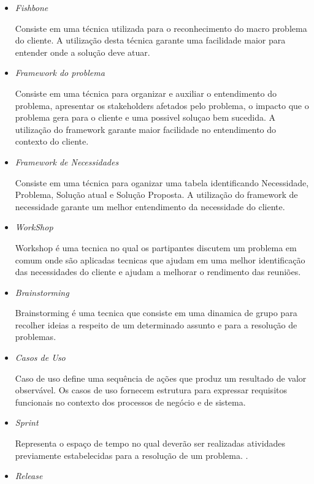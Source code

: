 \begin{itemize}
	\item \textit{Fishbone}

		Consiste em uma técnica utilizada para o reconhecimento do macro problema do cliente. A utilização desta técnica garante uma facilidade maior para entender onde a solução deve atuar.

	\item \textit{Framework do problema}

		Consiste em uma técnica para organizar e auxiliar o entendimento do problema, apresentar os stakeholders afetados pelo problema, o impacto que o problema gera para o cliente e uma possivel soluçao bem sucedida. A utilização do framework garante maior facilidade no entendimento do contexto do cliente.

	\item \textit{Framework de Necessidades}

		Consiste em uma técnica para oganizar uma tabela identificando Necessidade, Problema, Solução atual e Solução Proposta. A utilização do framework de necessidade garante um melhor entendimento da necessidade do cliente.
 
	\item \textit{WorkShop}

		 Workshop é uma tecnica no qual os partipantes discutem um problema em comum onde são aplicadas tecnicas que ajudam em uma melhor identificação das necessidades do cliente e ajudam a melhorar o rendimento das reuniões.

	\item \textit{Brainstorming}

		 Brainstorming é uma tecnica que consiste em uma dinamica de grupo para recolher ideias a respeito de um determinado assunto e para a resolução de problemas.

	\item \textit{Casos de Uso}

		 Caso de uso define uma sequência de ações que produz um resultado de valor observável. Os casos de uso fornecem estrutura para expressar requisitos funcionais no contexto dos processos de negócio e de sistema.

	\item \textit{Sprint}

		Representa o espaço de tempo no qual deverão ser realizadas atividades previamente estabelecidas para a resolução de um problema. \cite{beck2000extreme}.

	\item \textit{Release}


\end{itemize}

